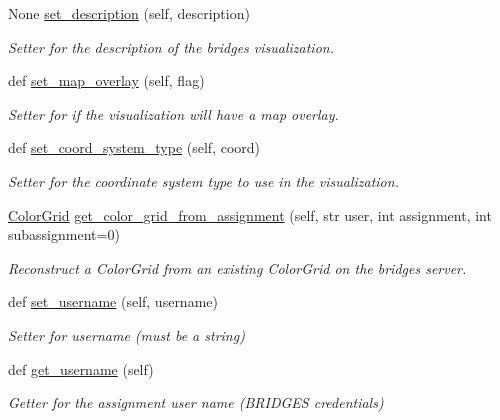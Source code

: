 \begin{DoxyCompactItemize}
None \mbox{\hyperlink{classbridges_1_1bridges_1_1_bridges_ac61a47f230c8f96f85d810498fad8b97}{set\+\_\+description}} (self, description)
\begin{DoxyCompactList}\small\item\em Setter for the description of the bridges visualization. \end{DoxyCompactList}\item 
def \mbox{\hyperlink{classbridges_1_1bridges_1_1_bridges_ae9ed34b5878d9d120949da0b7e4d2911}{set\+\_\+map\+\_\+overlay}} (self, flag)
\begin{DoxyCompactList}\small\item\em Setter for if the visualization will have a map overlay. \end{DoxyCompactList}\item 
def \mbox{\hyperlink{classbridges_1_1bridges_1_1_bridges_a6bc905490b1995234f88f47af9aa8a17}{set\+\_\+coord\+\_\+system\+\_\+type}} (self, coord)
\begin{DoxyCompactList}\small\item\em Setter for the coordinate system type to use in the visualization. \end{DoxyCompactList}\item 
\mbox{\hyperlink{classbridges_1_1color__grid_1_1_color_grid}{Color\+Grid}} \mbox{\hyperlink{classbridges_1_1bridges_1_1_bridges_a0f809dc3197c139c4e3d178c89b2fa46}{get\+\_\+color\+\_\+grid\+\_\+from\+\_\+assignment}} (self, str user, int assignment, int subassignment=0)
\begin{DoxyCompactList}\small\item\em Reconstruct a Color\+Grid from an existing Color\+Grid on the bridges server. \end{DoxyCompactList}\item 
def \mbox{\hyperlink{classbridges_1_1bridges_1_1_bridges_a3f97735d336faf40585e99362d64a3ee}{set\+\_\+username}} (self, username)
\begin{DoxyCompactList}\small\item\em Setter for username (must be a string) \end{DoxyCompactList}\item 
def \mbox{\hyperlink{classbridges_1_1bridges_1_1_bridges_abf6fdb19db336c2ed14987fdd89d65fe}{get\+\_\+username}} (self)
\begin{DoxyCompactList}\small\item\em Getter for the assignment user name (B\+R\+I\+D\+G\+ES credentials) \end{DoxyCompactList}\item 

\end{DoxyCompactItemize}

